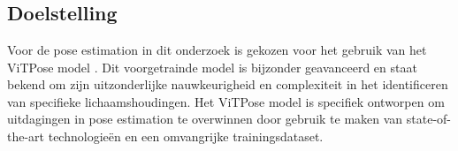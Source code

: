 \chapter{}%
\label{ch:poseestimation}

\section{Doelstelling}
Voor de pose estimation in dit onderzoek is gekozen voor het gebruik van het ViTPose model \textcite{xu2022vitpose+}. Dit voorgetrainde model is bijzonder geavanceerd en staat bekend om zijn uitzonderlijke nauwkeurigheid en complexiteit in het identificeren van specifieke lichaamshoudingen. Het ViTPose model is specifiek ontworpen om uitdagingen in pose estimation te overwinnen door gebruik te maken van state-of-the-art technologieën en een omvangrijke trainingsdataset.

